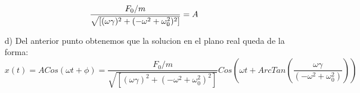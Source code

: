 \documentclass[a4paper]{article}
\begin{document}
\begin{answer}[Problema 5.]
\begin{enumerate}
\begin{equation*}
\begin{split}
                 \end{split}
             \end{equation*}
             \begin{equation*}
                 \begin{split}
                     \frac{F_0/m}{\sqrt{\left[(\omega\gamma)^2+ (-\omega^2  + \omega_0^2)^2\right]}}
                     &= A\hspace{0.3cm}\\
                 \end{split}
             \end{equation*}
    \item[d)] Del anterior punto obtenemos que la solucion en el plano real queda de la forma:
    $$x(t) = ACos(\omega t + \phi) =   \frac{F_0/m}{\sqrt{\left[(\omega\gamma)^2+ (-\omega^2  + \omega_0^2)^2\right]}}Cos\left(\omega t + ArcTan\left(\frac{ \omega\gamma}{ (-\omega^2  + \omega_0^2)}\right)\right)$$
        \end{enumerate}
    \end{answer}
    
\end{document}

